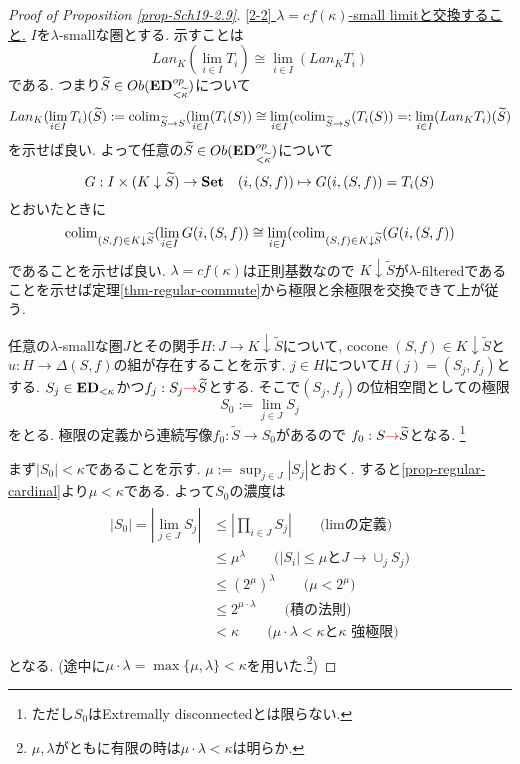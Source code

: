 \documentclass[dvipdfmx,a4paper,11pt]{report}
\newcommand{\colim}{{\rm colim}}
\theoremstyle{definition}
\newcommand{\xr}[1]{\textcolor{red}{#1}}
\begin{document}
\begin{proof}[Proof of Proposition \ref{prop-Sch19-2.9}]
\underline{[2-2] $\lambda=cf(\kappa)$-small limitと交換すること.}
$I$を$\lambda$-smallな圏とする.
示すことは
$$
Lan_{K}(\lim_{i \in I}T_{i})  \cong \lim_{i \in I}( Lan_{K} T_{i})
$$
である. つまり$\widetilde{S} \in Ob({\bf ED}_{<\widetilde{\kappa}}^{op})$について
$$
Lan_{K}(\lim_{i \in I}T_{i})(\widetilde{S} )
:=
\colim_{\widetilde{S} \to S} (\lim_{i \in I} (T_{i}(S) )
\cong
\lim_{i \in I}(\colim_{\widetilde{S} \to S} (T_{i} (S))
=:
\lim_{i \in I}( Lan_{K} T_{i})(\widetilde{S} )
$$
を示せば良い.
よって任意の$\widetilde{S} \in Ob({\bf ED}_{< \widetilde{\kappa}}^{op})$について
$$
G : I \times (K \downarrow \widetilde{S})
\to {\bf Set} 
\quad
(i,(S, f)) \mapsto G(i,(S, f))=T_{i}(S)
$$
とおいたときに
$$
\colim_{(S, f) \in K \downarrow \widetilde{S}}
 (\lim_{i \in I} G(i,(S, f))
\cong 
\lim_{i \in I}
(\colim_{(S, f) \in K \downarrow \widetilde{S}} ( G(i,(S, f))
$$
であることを示せば良い. 
$\lambda = cf(\kappa)$は正則基数なので
$K \downarrow \widetilde{S}$が$\lambda$-filteredであることを示せば定理\ref{thm-regular-commute}から極限と余極限を交換できて上が従う. 

任意の$\lambda$-smallな圏$J$とその関手$H : J \to K \downarrow \widetilde{S}$について, cocone $(S,f) \in K \downarrow \widetilde{S}$と$u : H \to \Delta (S,f)$の組が存在することを示す.
$j \in H$について$H(j) = (S_j,f_j)$とする. 
$S_j \in {\bf ED}_{<\kappa}$かつ$f_j :  S_{j} \xr{\to} \widetilde{S}$とする.
そこで$(S_j,f_j)$の位相空間としての極限
$$
S_0 := \lim_{j \in J}S_j
$$
をとる. 
極限の定義から連続写像$f_0 : \widetilde{S} \to S_0$があるので
$f_0 : S \xr{\to} \widetilde{S}$となる. \footnote{ただし$S_0$はExtremally disconnectedとは限らない.}

まず$|S_0| < \kappa$であることを示す.
$\mu := \sup_{j \in J} |S_j|$とおく. 
すると\ref{prop-regular-cardinal}より$\mu < \kappa$である.
よって$S_0$の濃度は
\begin{align*}
\begin{split}
|S_0| = | \lim_{j \in J} S_j| 
&\le |\prod_{i \in J} S_j|   \quad\quad \text{(limの定義)}\\
&\le \mu^{\lambda} \quad\quad \text{($|S_i| \le \mu$と$J \to \cup_{j}S_j$)}\\
&\le (2^{\mu})^{\lambda} \quad\quad \text{($\mu < 2^{\mu}$)}\\
&\le 2^{\mu \cdot \lambda}\quad\quad \text{(積の法則)}\\
&< \kappa \quad\quad \text{($\mu \cdot \lambda < \kappa$と$\kappa$ 強極限)}\\
\end{split}
\end{align*}
となる. (途中に$\mu \cdot \lambda =\max \{\mu, \lambda \} < \kappa$を用いた.\footnote{$\mu,  \lambda $がともに有限の時は$\mu \cdot \lambda < \kappa$は明らか. })


\end{proof}
\end{document}
